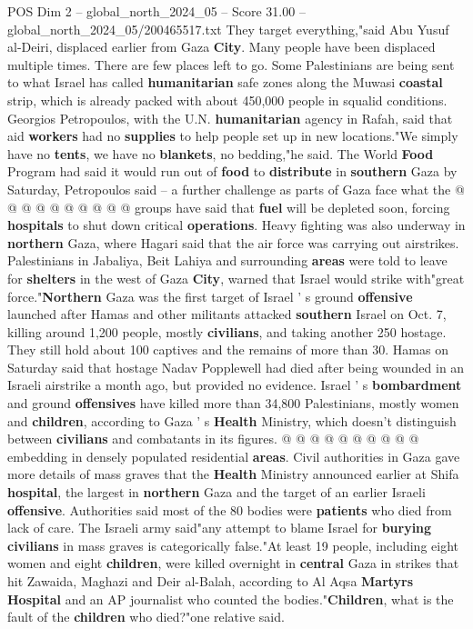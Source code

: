 \begin{textsample}{POS Dim 2 – global\_north\_2024\_05 – Score 31.00 – global\_north\_2024\_05/200465517.txt}
They target everything,"said Abu Yusuf al-Deiri, displaced earlier from Gaza \textbf{City}.
Many people have been displaced multiple times.
There are few places left to go.
Some Palestinians are being sent to what Israel has called \textbf{humanitarian} safe zones along the Muwasi \textbf{coastal} strip, which is already packed with about 450,000 people in squalid conditions.
Georgios Petropoulos, with the U.N. \textbf{humanitarian} agency in Rafah, said that aid \textbf{workers} had no \textbf{supplies} to help people set up in new locations."We simply have no \textbf{tents}, we have no \textbf{blankets}, no bedding,"he said.
The World \textbf{Food} Program had said it would run out of \textbf{food} to \textbf{distribute} in \textbf{southern} Gaza by Saturday, Petropoulos said -- a further challenge as parts of Gaza face what the @ @ @ @ @ @ @ @ @ @ groups have said that \textbf{fuel} will be depleted soon, forcing \textbf{hospitals} to shut down critical \textbf{operations}.
Heavy fighting was also underway in \textbf{northern} Gaza, where Hagari said that the air force was carrying out airstrikes.
Palestinians in Jabaliya, Beit Lahiya and surrounding \textbf{areas} were told to leave for \textbf{shelters} in the west of Gaza \textbf{City}, warned that Israel would strike with"great force."\textbf{Northern} Gaza was the first target of Israel ' s ground \textbf{offensive} launched after Hamas and other militants attacked \textbf{southern} Israel on Oct. 7, killing around 1,200 people, mostly \textbf{civilians}, and taking another 250 hostage.
They still hold about 100 captives and the remains of more than 30.
Hamas on Saturday said that hostage Nadav Popplewell had died after being wounded in an Israeli airstrike a month ago, but provided no evidence.
Israel ' s \textbf{bombardment} and ground \textbf{offensives} have killed more than 34,800 Palestinians, mostly women and \textbf{children}, according to Gaza ' s \textbf{Health} Ministry, which doesn't distinguish between \textbf{civilians} and combatants in its figures. @ @ @ @ @ @ @ @ @ @ embedding in densely populated residential \textbf{areas}.
Civil authorities in Gaza gave more details of mass graves that the \textbf{Health} Ministry announced earlier at Shifa \textbf{hospital}, the largest in \textbf{northern} Gaza and the target of an earlier Israeli \textbf{offensive}.
Authorities said most of the 80 bodies were \textbf{patients} who died from lack of care.
The Israeli army said"any attempt to blame Israel for \textbf{burying} \textbf{civilians} in mass graves is categorically false."At least 19 people, including eight women and eight \textbf{children}, were killed overnight in \textbf{central} Gaza in strikes that hit Zawaida, Maghazi and Deir al-Balah, according to Al Aqsa \textbf{Martyrs} \textbf{Hospital} and an AP journalist who counted the bodies."\textbf{Children}, what is the fault of the \textbf{children} who died?"one relative said.

\end{textsample}
